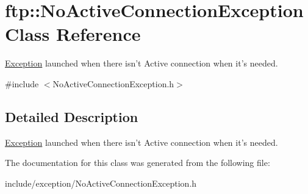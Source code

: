 \hypertarget{classftp_1_1_no_active_connection_exception}{\section{ftp\-:\-:No\-Active\-Connection\-Exception Class Reference}
\label{classftp_1_1_no_active_connection_exception}
}


\hyperlink{classftp_1_1_exception}{Exception} launched when there isn't Active connection when it's needed.  




{\ttfamily \#include $<$No\-Active\-Connection\-Exception.\-h$>$}



\subsection{Detailed Description}
\hyperlink{classftp_1_1_exception}{Exception} launched when there isn't Active connection when it's needed. 

The documentation for this class was generated from the following file\-:\begin{DoxyCompactItemize}
\item 
include/exception/No\-Active\-Connection\-Exception.\-h\end{DoxyCompactItemize}
